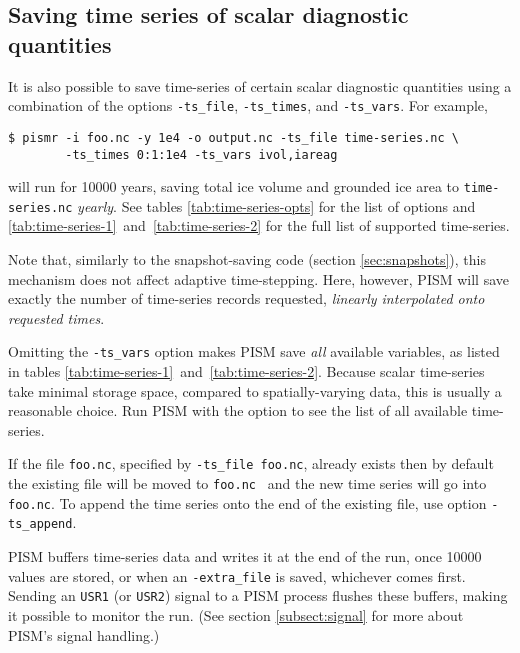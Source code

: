 \subsection{Saving time series of scalar diagnostic quantities}
\label{sec:saving-time-series}

 It is also possible to save time-series of certain scalar diagnostic quantities using a combination of the options \texttt{-ts_file}, \texttt{-ts_times}, and \texttt{-ts_vars}.  For example,
\begin{verbatim}
$ pismr -i foo.nc -y 1e4 -o output.nc -ts_file time-series.nc \
        -ts_times 0:1:1e4 -ts_vars ivol,iareag
\end{verbatim}
will run for 10000 years, saving total ice volume and grounded ice area to \texttt{time-series.nc} \emph{yearly}. See tables \ref{tab:time-series-opts} for the list of options and \ref{tab:time-series-1}~and~\ref{tab:time-series-2} for the full list of supported time-series.

Note that, similarly to the snapshot-saving code (section \ref{sec:snapshots}), this mechanism does not affect adaptive time-stepping.  Here, however, PISM will save exactly the number of time-series records requested, \emph{linearly interpolated onto requested times}.

Omitting the \texttt{-ts_vars} option makes PISM save \emph{all} available
variables, as listed in tables
\ref{tab:time-series-1}~and~\ref{tab:time-series-2}.  Because scalar
time-series take minimal storage space, compared to spatially-varying data,
this is usually a reasonable choice. Run PISM with the
 option to see the list of all available time-series.

If the file \texttt{foo.nc}, specified by \texttt{-ts_file foo.nc}, already exists then by default the existing file will be moved to \texttt{foo.nc~} and the new time series will go into \texttt{foo.nc}.  To append the time series onto the end of the existing file, use option \texttt{-ts_append}.

PISM buffers time-series data and writes it at the end of the run, once 10000
values are stored, or when an \texttt{-extra_file} is saved, whichever comes first. Sending an \texttt{USR1} (or
\texttt{USR2}) signal to a PISM process flushes these buffers, making it
possible to monitor the run. (See section \ref{subsect:signal} for more about
PISM's signal handling.)

